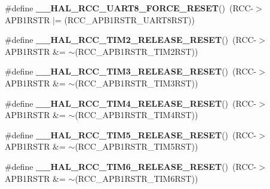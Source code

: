 \begin{DoxyCompactItemize}
\#define {\bfseries \+\_\+\+\_\+\+H\+A\+L\+\_\+\+R\+C\+C\+\_\+\+U\+A\+R\+T8\+\_\+\+F\+O\+R\+C\+E\+\_\+\+R\+E\+S\+ET}()~(R\+CC-\/$>$A\+P\+B1\+R\+S\+TR $\vert$= (R\+C\+C\+\_\+\+A\+P\+B1\+R\+S\+T\+R\+\_\+\+U\+A\+R\+T8\+R\+ST))
\item 
\mbox{\label{group___r_c_c_ex___force___release___peripheral___reset_ga4b1b3b45c95788edb29ccd2bf6994826}} 
\#define {\bfseries \+\_\+\+\_\+\+H\+A\+L\+\_\+\+R\+C\+C\+\_\+\+T\+I\+M2\+\_\+\+R\+E\+L\+E\+A\+S\+E\+\_\+\+R\+E\+S\+ET}()~(R\+CC-\/$>$A\+P\+B1\+R\+S\+TR \&= $\sim$(R\+C\+C\+\_\+\+A\+P\+B1\+R\+S\+T\+R\+\_\+\+T\+I\+M2\+R\+ST))
\item 
\mbox{\label{group___r_c_c_ex___force___release___peripheral___reset_ga27cf9c39217fff6ae9bce2285d9aff8c}} 
\#define {\bfseries \+\_\+\+\_\+\+H\+A\+L\+\_\+\+R\+C\+C\+\_\+\+T\+I\+M3\+\_\+\+R\+E\+L\+E\+A\+S\+E\+\_\+\+R\+E\+S\+ET}()~(R\+CC-\/$>$A\+P\+B1\+R\+S\+TR \&= $\sim$(R\+C\+C\+\_\+\+A\+P\+B1\+R\+S\+T\+R\+\_\+\+T\+I\+M3\+R\+ST))
\item 
\mbox{\label{group___r_c_c_ex___force___release___peripheral___reset_gaab43d37f4682740d15c4b1fadb908d51}} 
\#define {\bfseries \+\_\+\+\_\+\+H\+A\+L\+\_\+\+R\+C\+C\+\_\+\+T\+I\+M4\+\_\+\+R\+E\+L\+E\+A\+S\+E\+\_\+\+R\+E\+S\+ET}()~(R\+CC-\/$>$A\+P\+B1\+R\+S\+TR \&= $\sim$(R\+C\+C\+\_\+\+A\+P\+B1\+R\+S\+T\+R\+\_\+\+T\+I\+M4\+R\+ST))
\item 
\mbox{\label{group___r_c_c_ex___force___release___peripheral___reset_gaf7e0cde5ea8f6425d87ebf2d91e8b360}} 
\#define {\bfseries \+\_\+\+\_\+\+H\+A\+L\+\_\+\+R\+C\+C\+\_\+\+T\+I\+M5\+\_\+\+R\+E\+L\+E\+A\+S\+E\+\_\+\+R\+E\+S\+ET}()~(R\+CC-\/$>$A\+P\+B1\+R\+S\+TR \&= $\sim$(R\+C\+C\+\_\+\+A\+P\+B1\+R\+S\+T\+R\+\_\+\+T\+I\+M5\+R\+ST))
\item 
\mbox{\label{group___r_c_c_ex___force___release___peripheral___reset_ga7eba1763b83169bc7cec3e10bfbccf20}} 
\#define {\bfseries \+\_\+\+\_\+\+H\+A\+L\+\_\+\+R\+C\+C\+\_\+\+T\+I\+M6\+\_\+\+R\+E\+L\+E\+A\+S\+E\+\_\+\+R\+E\+S\+ET}()~(R\+CC-\/$>$A\+P\+B1\+R\+S\+TR \&= $\sim$(R\+C\+C\+\_\+\+A\+P\+B1\+R\+S\+T\+R\+\_\+\+T\+I\+M6\+R\+ST))

\end{DoxyCompactItemize}
